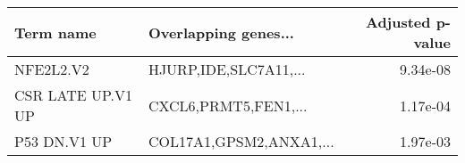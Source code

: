 \begin{tabular}{llr}
\toprule
        Term name &    Overlapping genes... &  Adjusted p-value \\
\midrule
        NFE2L2.V2 &   HJURP,IDE,SLC7A11,... &          9.34e-08 \\
CSR LATE UP.V1 UP &    CXCL6,PRMT5,FEN1,... &          1.17e-04 \\
     P53 DN.V1 UP & COL17A1,GPSM2,ANXA1,... &          1.97e-03 \\
\bottomrule
\end{tabular}
